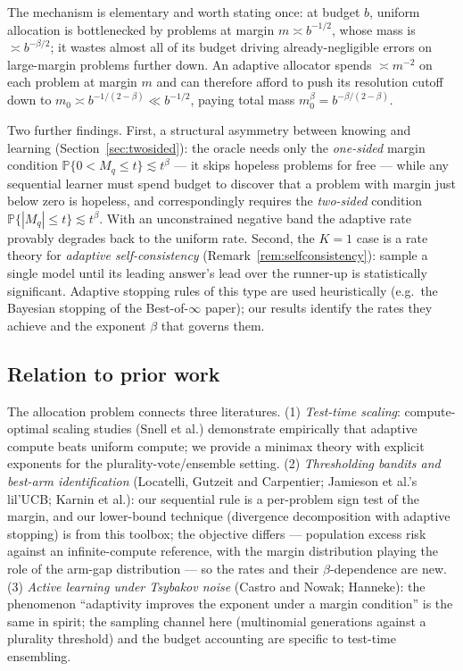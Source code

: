 \documentclass[11pt]{article}
\newcommand{\Pp}{\mathbb P}
\begin{document}
The mechanism is elementary and worth stating once: at budget $b$, uniform
allocation is bottlenecked by problems at margin $m\asymp b^{-1/2}$, whose
mass is $\asymp b^{-\beta/2}$; it wastes almost all of its budget driving
already-negligible errors on large-margin problems further down.  An
adaptive allocator spends $\asymp m^{-2}$ on each problem at margin $m$ and
can therefore afford to push its resolution cutoff down to
$m_0\asymp b^{-1/(2-\beta)}\ll b^{-1/2}$, paying total mass
$m_0^\beta=b^{-\beta/(2-\beta)}$.

Two further findings.  First, a structural asymmetry between knowing and
learning (Section~\ref{sec:twosided}): the oracle needs only the
\emph{one-sided} margin condition $\Pp\{0<M_q\le t\}\lesssim t^\beta$ ---
it skips hopeless problems for free --- while any sequential learner must
spend budget to discover that a problem with margin just below zero is
hopeless, and correspondingly requires the \emph{two-sided} condition
$\Pp\{|M_q|\le t\}\lesssim t^\beta$.  With an unconstrained negative band the
adaptive rate provably degrades back to the uniform rate.  Second, the
$K=1$ case is a rate theory for \emph{adaptive self-consistency}
(Remark~\ref{rem:selfconsistency}): sample a single model until its leading
answer's lead over the runner-up is statistically significant.  Adaptive
stopping rules of this type are used heuristically (e.g.\ the Bayesian
stopping of the Best-of-$\infty$ paper); our results identify the rates they
achieve and the exponent $\beta$ that governs them.

\subsection{Relation to prior work}

The allocation problem connects three literatures.  (1) \emph{Test-time
scaling}: compute-optimal scaling studies (Snell et al.) demonstrate
empirically that adaptive compute beats uniform compute; we provide a
minimax theory with explicit exponents for the plurality-vote/ensemble
setting.  (2) \emph{Thresholding bandits and best-arm identification}
(Locatelli, Gutzeit and Carpentier; Jamieson et al.'s lil'UCB; Karnin et
al.): our sequential rule is a per-problem sign test of the margin, and our
lower-bound technique (divergence decomposition with adaptive stopping) is
from this toolbox; the objective differs --- population excess risk against
an infinite-compute reference, with the margin distribution playing the
role of the arm-gap distribution --- so the rates and their $\beta$-dependence
are new.  (3) \emph{Active learning under Tsybakov noise} (Castro and
Nowak; Hanneke): the phenomenon ``adaptivity improves the exponent under a
margin condition'' is the same in spirit; the sampling channel here
(multinomial generations against a plurality threshold) and the budget
accounting are specific to test-time ensembling.
\end{document}
